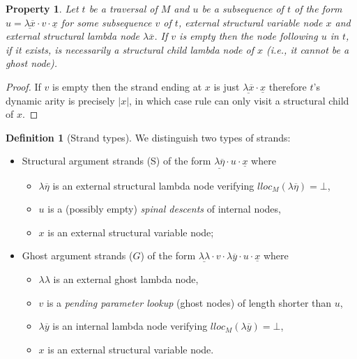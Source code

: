\documentclass{elsarticle}
\makeatletter
\theoremstyle{plain}
\newtheorem{property}[theorem]{Property}
\theoremstyle{definition}
\newtheorem{definition}{Definition}[section]
\theoremstyle{remark}
\newcommand{\ghostlmd}{{\lambda\!\!\lambda}}
\renewcommand\ie{{\it i.e.\@\xspace}}
\makeatother
\begin{document}
\begin{property}
\label{prop:strand_spinaldescent}
Let $t$ be a traversal of $M$ and $u$ be a subsequence of $t$ of the form
$u = \underline{\lambda \overline{x}} \cdot v \cdot \underline{x}$
for some subsequence $v$ of $t$, external structural variable node $x$ and external structural lambda node $\lambda \overline{x}$.
If $v$ is empty then the node following $u$ in $t$, if it exists, is necessarily a structural child lambda node of $x$ (\ie, it cannot be a ghost node).
\end{property}
\begin{proof}
 If $v$ is empty then the strand ending at $x$
 is just $\underline{\lambda \overline{x}} \cdot \underline{x}$ therefore
 $t$'s dynamic arity is precisely $|x|$, in which case rule  can only visit a structural child of $x$.
\end{proof}

\begin{definition}[Strand types]
    \label{def:strandtypes} We distinguish two types of strands:
    \begin{itemize}[nosep]
        \item Structural argument strands (S) of the form $\underline{\lambda\overline{\eta}} \cdot u \cdot \underline{x}$
            where
            \begin{itemize}[nosep]
            \item $\lambda\overline{\eta}$ is an external structural lambda node verifying $lloc_M(\lambda\overline\eta) = \bot$,
            \item $u$ is a (possibly empty) \emph{spinal descents} of internal nodes,
            \item $x$ is an external structural variable node;
            \end{itemize}

        \item Ghost argument strands ($G$) of the form $\underline{\ghostlmd} \cdot  v \cdot \lambda\overline{y} \cdot u \cdot \underline{x}$
        where
        \begin{itemize}[nosep]
            \item $\ghostlmd$ is an external ghost lambda node,
            \item $v$ is a \emph{pending parameter lookup} (ghost nodes) of length shorter than $u$,
            \item $\lambda\overline{y}$ is an internal lambda node verifying $lloc_M(\lambda\overline{y}) = \bot$,
            \item $x$ is an external structural variable node.
        \end{itemize}
    \end{itemize}
\end{definition}
\end{document}
